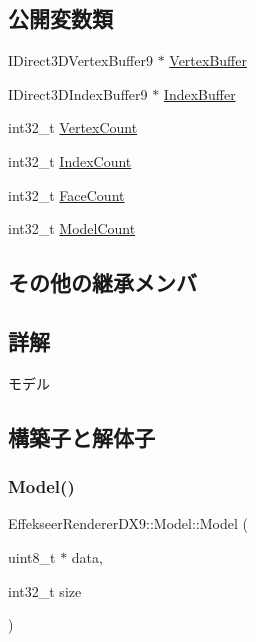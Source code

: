 \subsection*{公開変数類}
\begin{DoxyCompactItemize}
\item 
I\+Direct3\+D\+Vertex\+Buffer9 $\ast$ \mbox{\hyperlink{class_effekseer_renderer_d_x9_1_1_model_a3f1525a836e0b7126f0473fa1dbcd9fd}{Vertex\+Buffer}}
\item 
I\+Direct3\+D\+Index\+Buffer9 $\ast$ \mbox{\hyperlink{class_effekseer_renderer_d_x9_1_1_model_aede495b02db0ee91a250a676da213178}{Index\+Buffer}}
\item 
int32\+\_\+t \mbox{\hyperlink{class_effekseer_renderer_d_x9_1_1_model_a2ce7d9a13cdc07992bd3b9ca90eefb55}{Vertex\+Count}}
\item 
int32\+\_\+t \mbox{\hyperlink{class_effekseer_renderer_d_x9_1_1_model_a649ff94ad2a29a8cd382878219a286a2}{Index\+Count}}
\item 
int32\+\_\+t \mbox{\hyperlink{class_effekseer_renderer_d_x9_1_1_model_a6cb35a6225c2f948206647be98c65506}{Face\+Count}}
\item 
int32\+\_\+t \mbox{\hyperlink{class_effekseer_renderer_d_x9_1_1_model_a993f041558265db631654723ca973e0a}{Model\+Count}}
\end{DoxyCompactItemize}
\subsection*{その他の継承メンバ}


\subsection{詳解}
モデル 

\subsection{構築子と解体子}
\mbox{\label{class_effekseer_renderer_d_x9_1_1_model_a2cc666c9789232bbe6bb09e5cf3fad6a}} 
\subsubsection{\texorpdfstring{Model()}{Model()}}
{\footnotesize\ttfamily Effekseer\+Renderer\+D\+X9\+::\+Model\+::\+Model (\begin{DoxyParamCaption}\item[{uint8\+\_\+t $\ast$}]{data,  }\item[{int32\+\_\+t}]{size }\end{DoxyParamCaption})\hspace{0.3cm}{\ttfamily [inline]}}

